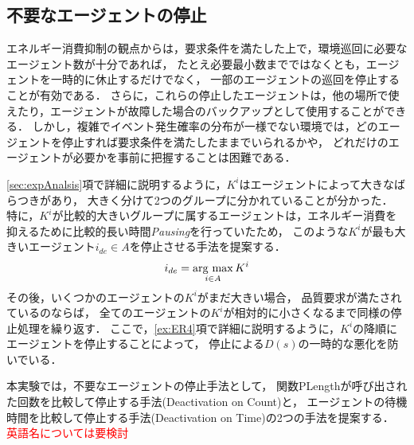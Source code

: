 \documentclass[12pt,a4j,twoside]{jarticle}
\newcommand{\argmax}{\mathop{\rm arg~max}\limits}
\def\AgentSet{A}
\def\red#1{\textcolor{red}{#1}}
\begin{document}
  \subsection{不要なエージェントの停止}\label{sec:deactivation}
  エネルギー消費抑制の観点からは，要求条件を満たした上で，環境巡回に必要なエージェント数が十分であれば，
  たとえ必要最小数までではなくとも，エージェントを一時的に休止するだけでなく，
  一部のエージェントの巡回を停止することが有効である．
  さらに，これらの停止したエージェントは，他の場所で使えたり，エージェントが故障した場合のバックアップとして使用することができる．
  しかし，複雑でイベント発生確率の分布が一様でない環境では，どのエージェントを停止すれば要求条件を満たしたままでいられるかや，
  どれだけのエージェントが必要かを事前に把握することは困難である．
  \par

  \ref{sec:expAnalsis}項で詳細に説明するように，$K^i$はエージェントによって大きなばらつきがあり，
  大きく分けて2つのグループに分かれていることが分かった．
  特に，$K^i$が比較的大きいグループに属するエージェントは，エネルギー消費を抑えるために比較的長い時間{\em Pausing}を行っていたため，
  このような$K^i$が最も大きいエージェント$i_{de}\in\AgentSet$を停止させる手法を提案する．
  \begin{equation}
    i_{de} = \argmax_{i\in\AgentSet} K^i
  \end{equation}
  その後，いくつかのエージェントの$K^i$がまだ大きい場合，
  品質要求が満たされているのならば，
  全てのエージェントの$K^i$が相対的に小さくなるまで同様の停止処理を繰り返す．
  ここで，\ref{ex:ER4}項で詳細に説明するように，$K^i$の降順にエージェントを停止することによって，
  停止による$D(s)$の一時的な悪化を防いでいる．
  \par

  本実験では，不要なエージェントの停止手法として，
  関数\textsf{PLength}が呼び出された回数を比較して停止する手法(Deactivation on Count)と，
  エージェントの待機時間を比較して停止する手法(Deactivation on Time)の2つの手法を提案する．
  \\ \red{英語名については要検討}\\
\end{document}
